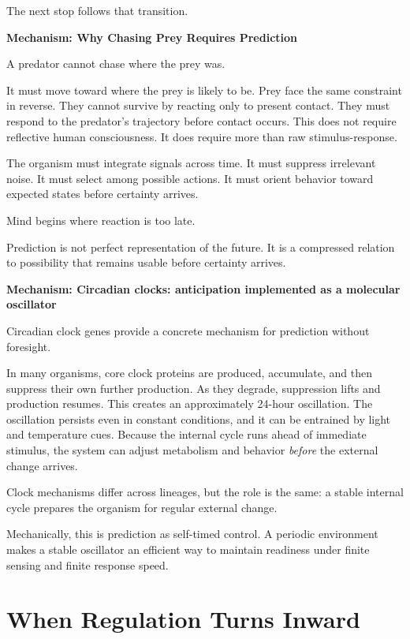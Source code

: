\documentclass[11pt,twoside,openright]{book}
\newenvironment{mechanismbox}[1]
  {\begin{framed}\noindent\textbf{Mechanism: #1}\par\medskip}
  {\end{framed}}
\begin{document}
The next stop follows that transition.

\begin{mechanismbox}{Why Chasing Prey Requires Prediction}
A predator cannot chase where the prey was.

It must move toward where the prey is likely to be. Prey face the same constraint in reverse. They cannot survive by reacting only to present contact. They must respond to the predator's trajectory before contact occurs. This does not require reflective human consciousness. It does require more than raw stimulus-response.

The organism must integrate signals across time. It must suppress irrelevant noise. It must select among possible actions. It must orient behavior toward expected states before certainty arrives.

Mind begins where reaction is too late.

Prediction is not perfect representation of the future.
It is a compressed relation to possibility
that remains usable before certainty arrives.
\end{mechanismbox}
\begin{mechanismbox}{Circadian clocks: anticipation implemented as a molecular oscillator}
Circadian clock genes provide a concrete mechanism for prediction without foresight.

In many organisms, core clock proteins are produced, accumulate, and then suppress their own further production. As they degrade, suppression lifts and production resumes. This creates an approximately 24-hour oscillation. The oscillation persists even in constant conditions, and it can be entrained by light and temperature cues. Because the internal cycle runs ahead of immediate stimulus, the system can adjust metabolism and behavior \emph{before} the external change arrives.

Clock mechanisms differ across lineages, but the role is the same: a stable internal cycle prepares the organism for regular external change.

Mechanically, this is prediction as self-timed control.
A periodic environment makes a stable oscillator an efficient way to maintain readiness under finite sensing and finite response speed.
\end{mechanismbox}

\chapter{When Regulation Turns Inward}
\end{document}
